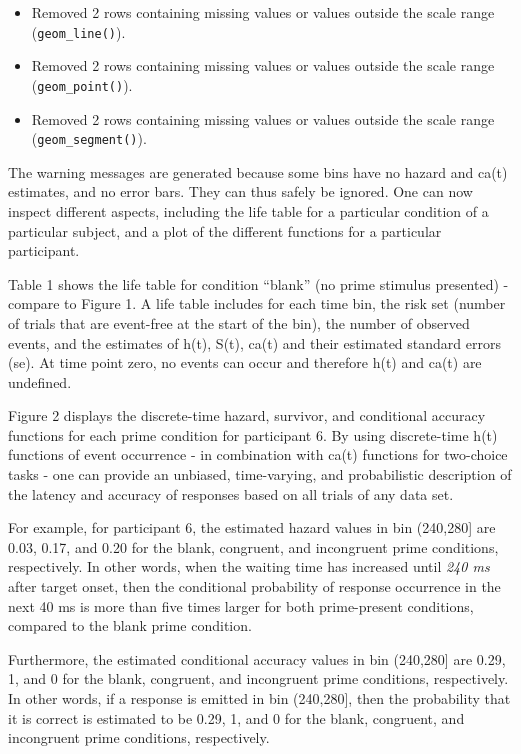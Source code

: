 \documentclass[
  man,floatsintext]{apa6}
\providecommand{\tightlist}{%
  \setlength{\itemsep}{0pt}\setlength{\parskip}{0pt}}
\begin{document}
\begin{itemize}
\tightlist
\item
  Removed 2 rows containing missing values or values outside the scale range (\texttt{geom\_line()}).
\item
  Removed 2 rows containing missing values or values outside the scale range (\texttt{geom\_point()}).
\item
  Removed 2 rows containing missing values or values outside the scale range (\texttt{geom\_segment()}).
\end{itemize}

The warning messages are generated because some bins have no hazard and ca(t) estimates, and no error bars. They can thus safely be ignored.
One can now inspect different aspects, including the life table for a particular condition of a particular subject, and a plot of the different functions for a particular participant.

Table 1 shows the life table for condition ``blank'' (no prime stimulus presented) - compare to Figure 1. A life table includes for each time bin, the risk set (number of trials that are event-free at the start of the bin), the number of observed events, and the estimates of h(t), S(t), ca(t) and their estimated standard errors (se). At time point zero, no events can occur and therefore h(t) and ca(t) are undefined.

Figure 2 displays the discrete-time hazard, survivor, and conditional accuracy functions for each prime condition for participant 6. By using discrete-time h(t) functions of event occurrence - in combination with ca(t) functions for two-choice tasks - one can provide an unbiased, time-varying, and probabilistic description of the latency and accuracy of responses based on all trials of any data set.

For example, for participant 6, the estimated hazard values in bin (240,280{]} are 0.03, 0.17, and 0.20 for the blank, congruent, and incongruent prime conditions, respectively. In other words, when the waiting time has increased until \emph{240 ms} after target onset, then the conditional probability of response occurrence in the next 40 ms is more than five times larger for both prime-present conditions, compared to the blank prime condition.

Furthermore, the estimated conditional accuracy values in bin (240,280{]} are 0.29, 1, and 0 for the blank, congruent, and incongruent prime conditions, respectively. In other words, if a response is emitted in bin (240,280{]}, then the probability that it is correct is estimated to be 0.29, 1, and 0 for the blank, congruent, and incongruent prime conditions, respectively.
\end{document}

